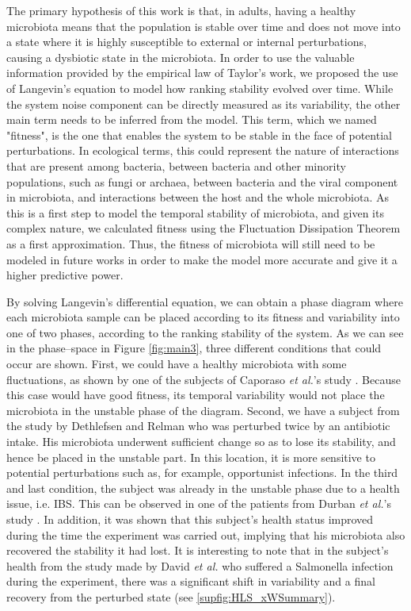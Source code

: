 The primary hypothesis of this work is that, in adults, having a healthy microbiota means that the population is stable over time and does not move into a state where it is highly susceptible to external or internal perturbations, causing a dysbiotic state in the microbiota. In order to use the valuable information provided by the empirical law of Taylor's work, we proposed the use of Langevin's equation to model how ranking stability evolved over time. While the system noise component can be directly measured as its variability, the other main term needs to be inferred from the model. This term, which we named "fitness", is the one that enables the system to be stable in the face of potential perturbations. In ecological terms, this could represent the nature of interactions that are present among bacteria, between bacteria and other minority populations, such as fungi or archaea, between bacteria and the viral component in microbiota, and interactions between the host and the whole microbiota. As this is a first step to model the temporal stability of microbiota, and given its complex nature, we calculated fitness using the Fluctuation Dissipation Theorem as a first approximation\cite{FD}. Thus, the fitness of microbiota will still need to be modeled in future works in order to make the model more accurate and give it a higher predictive power. 

By solving Langevin's differential equation, we can obtain a phase diagram where each microbiota sample can be placed according to its fitness and variability into one of two phases, according to the ranking stability of the system. As we can see in the phase--space in Figure \ref{fig:main3}, three different conditions that could occur are shown. First, we could have a healthy microbiota with some fluctuations, as shown by one of the subjects of Caporaso \emph{et al.}'s study \cite{moving}. Because this case would have good fitness, its temporal variability would not place the microbiota in the unstable phase of the diagram. Second, we have a subject from the study by Dethlefsen and Relman \cite{antibiotic} who was perturbed twice by an antibiotic intake. His microbiota underwent sufficient change so as to lose its stability, and hence be placed in the unstable part. In this location, it is more sensitive to potential perturbations such as, for example, opportunist infections. In the third and last condition, the subject was already in the unstable phase due to a health issue, i.e. IBS. This can be observed in one of the patients from Durban \emph{et al.}'s study \cite{IBS}. In addition, it was shown that this subject's health status improved during the time the experiment was carried out, implying that his microbiota also recovered the stability it had lost. It is interesting to note that in the subject's health from the study made by David \emph{et al.} \cite{hostlife} who suffered a Salmonella infection during the experiment, there was a significant shift in variability and a final recovery from the perturbed state (see \ref{supfig:HLS_xWSummary}).

